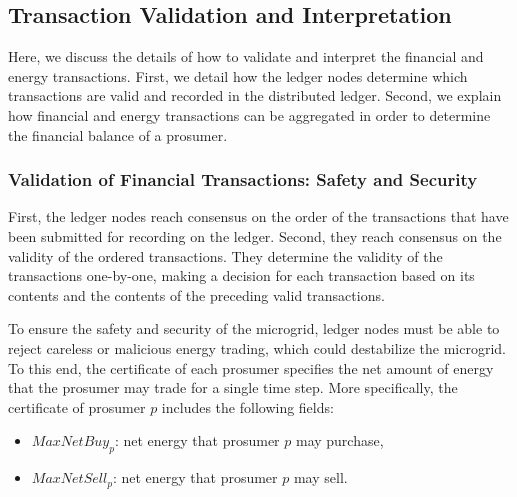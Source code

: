 \documentclass[sigconf]{acmart}
\begin{document}
\subsection{Transaction Validation and Interpretation}

Here, we discuss the details of how to validate and interpret the financial and energy transactions.
First, we detail how the ledger nodes determine which transactions are valid and recorded in the distributed ledger.
Second, we explain how financial and energy transactions can be aggregated in order to determine the financial balance of a prosumer.

\subsubsection{Validation of Financial Transactions: Safety and Security}

First, the ledger nodes reach consensus on the order of the transactions that have been submitted for recording on the ledger.
Second, they reach consensus on the validity of the ordered transactions.
They determine the validity of the transactions one-by-one, making a decision for each transaction based on its contents and the contents of the preceding valid transactions.

To ensure the safety and security of the microgrid, ledger nodes must be able to reject careless or malicious energy trading, which could destabilize the microgrid.
To this end, the certificate of each prosumer specifies the net amount of energy that the prosumer may trade for a single time step.
More specifically, the certificate of prosumer $p$ includes the following fields:
\begin{itemize}
\item $MaxNetBuy_p$: net energy that prosumer $p$ may purchase,
\item $MaxNetSell_p$: net energy that prosumer $p$ may sell.
\end{itemize}
\end{document}

